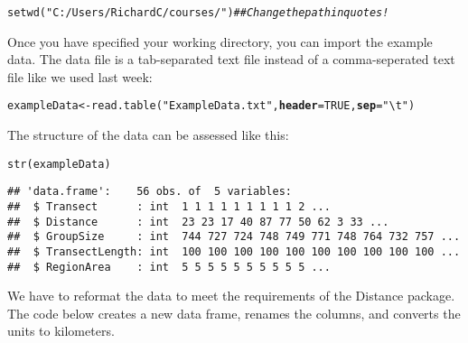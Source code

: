 \documentclass[12pt]{article}\usepackage[]{graphicx}\usepackage[]{color}
\makeatletter
\newcommand{\hlnum}[1]{\textcolor[rgb]{0.69,0.494,0}{#1}}%
\newcommand{\hlstr}[1]{\textcolor[rgb]{0.749,0.012,0.012}{#1}}%
\newcommand{\hlcom}[1]{\textcolor[rgb]{0.514,0.506,0.514}{\textit{#1}}}%
\newcommand{\hlstd}[1]{\textcolor[rgb]{0,0,0}{#1}}%
\newcommand{\hlkwb}[1]{\textcolor[rgb]{0,0.341,0.682}{#1}}%
\newcommand{\hlkwc}[1]{\textcolor[rgb]{0,0,0}{\textbf{#1}}}%
\newcommand{\hlkwd}[1]{\textcolor[rgb]{0.004,0.004,0.506}{#1}}%
\newenvironment{kframe}{%
 \def\at@end@of@kframe{}%
 \ifinner\ifhmode%
  \def\at@end@of@kframe{\end{minipage}}%
  \begin{minipage}{\columnwidth}%
 \fi\fi%
 \def\FrameCommand##1{\hskip\@totalleftmargin \hskip-\fboxsep
 \colorbox{shadecolor}{##1}\hskip-\fboxsep
     \hskip-\linewidth \hskip-\@totalleftmargin \hskip\columnwidth}%
 \MakeFramed {\advance\hsize-\width
   \@totalleftmargin\z@ \linewidth\hsize
   \@setminipage}}%
 {\par\unskip\endMakeFramed%
 \at@end@of@kframe}
\newenvironment{knitrout}{}{} %
\makeatother
\begin{document}
\begin{knitrout}
\color{fgcolor}\begin{kframe}
\begin{alltt}
\hlkwd{setwd}\hlstd{(}\hlstr{"C:/Users/RichardC/courses/"}\hlstd{)} \hlcom{## Change the path in quotes!}
\end{alltt}
\end{kframe}
\end{knitrout}

Once you have specified your working directory, you can import
the example data. The data file is a tab-separated text file
instead of a comma-seperated text file like we used last week:

\begin{knitrout}
\color{fgcolor}\begin{kframe}
\begin{alltt}
\hlstd{exampleData} \hlkwb{<-} \hlkwd{read.table}\hlstd{(}\hlstr{"ExampleData.txt"}\hlstd{,} \hlkwc{header}\hlstd{=}\hlnum{TRUE}\hlstd{,} \hlkwc{sep}\hlstd{=}\hlstr{"\textbackslash{}t"}\hlstd{)}
\end{alltt}
\end{kframe}
\end{knitrout}



The structure of the data can be assessed like this:

\begin{knitrout}
\color{fgcolor}\begin{kframe}
\begin{alltt}
\hlkwd{str}\hlstd{(exampleData)}
\end{alltt}
\begin{verbatim}
## 'data.frame':	56 obs. of  5 variables:
##  $ Transect      : int  1 1 1 1 1 1 1 1 1 2 ...
##  $ Distance      : int  23 23 17 40 87 77 50 62 3 33 ...
##  $ GroupSize     : int  744 727 724 748 749 771 748 764 732 757 ...
##  $ TransectLength: int  100 100 100 100 100 100 100 100 100 100 ...
##  $ RegionArea    : int  5 5 5 5 5 5 5 5 5 5 ...
\end{verbatim}
\end{kframe}
\end{knitrout}

\clearpage

We have to reformat the data to meet the requirements of the Distance
package. The code below creates a new data frame, renames the columns,
and converts the units to kilometers.
\end{document}
